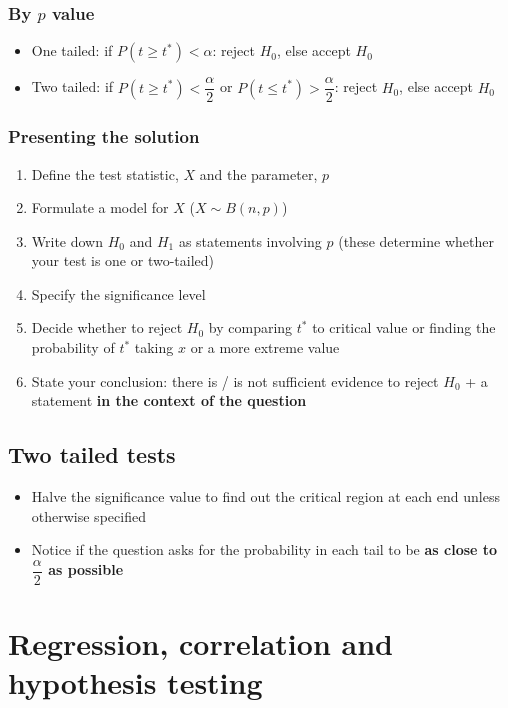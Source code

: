 \documentclass[fleqn, 11pt]{article}
\begin{document}
	
	\subsubsection{By $p$ value}
	\begin{itemize}
		\item One tailed: if $P(t\geq t^*) < \alpha$: reject $H_0$, else accept $H_0$
		\item Two tailed: if $P(t\geq t^*) < \dfrac{\alpha}{2}$ or $P(t\leq t^*) > \dfrac{\alpha}{2}$: reject $H_0$, else accept $H_0$
	\end{itemize}
	
	\subsubsection{Presenting the solution}
	\begin{enumerate}
		\item Define the test statistic, $X$ and the parameter, $p$
		\item Formulate a model for $X$ ($X \sim B(n, p)$)
		\item Write down $H_0$ and $H_1$ as statements involving $p$ (these determine whether your test is one or two-tailed)
		\item Specify the significance level
		\item Decide whether to reject $H_0$ by comparing $t^*$ to critical value or finding the probability of $t^*$ taking $x$ or a more extreme value
		\item State your conclusion: there is / is not sufficient evidence to reject $H_0$ + a statement \textbf{in the context of the question}
	\end{enumerate}
	
	\subsection{Two tailed tests}
	\begin{itemize}
		\item Halve the significance value to find out the critical region at each end unless otherwise specified
		\item Notice if the question asks for the probability in each tail to be \textbf{as close to $\dfrac{\alpha}{2}$ as possible}
	\end{itemize}
	
	\pagebreak
	
	
	\section{Regression, correlation and hypothesis testing}
	
\end{document}
